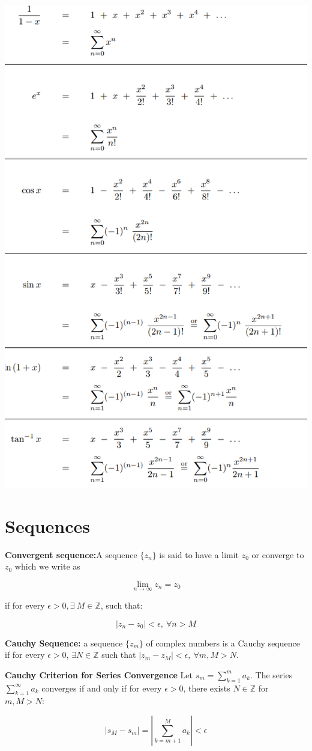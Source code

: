 \documentclass{article}
\theoremstyle{definition}
\begin{document}
\begin{multicols}{3}
\includegraphics[width=0.7\linewidth]{common_taylor_series}



\section{Sequences}
\textbf{Convergent sequence:}A sequence $\{z_n\}$ is said to have a limit $z_0$ or converge to $z_0$ which we write as 
	
	$$\lim_{n\to\infty} z_n = z_0$$
	
	if for every $\epsilon > 0, \exists\ M \in  \mathbb{Z}$, such that:
	
	$$|z_n - z_0| < \epsilon,\ \forall n > M$$

\textbf{Cauchy Sequence:} a sequence $\{z_m\}$ of complex numbers is a Cauchy sequence if for every $\epsilon>0$, $\exists N \in \mathbb{Z}$ such that $|z_m - z_M| < \epsilon,\ \forall m, M>N$.

\textbf{Cauchy Criterion for Series Convergence} Let $s_m = \sum_{k=1}^{m}a_k$. The series $\sum_{k=1}^{\infty}a_k$ converges if and only if for every $\epsilon>0$, there exists $N \in \mathbb{Z}$ for $m, M>N$:

$$|s_M - s_m| = \left|\sum_{k=m+1}^{M}a_k\right| < \epsilon$$


\end{multicols}
\end{document}
